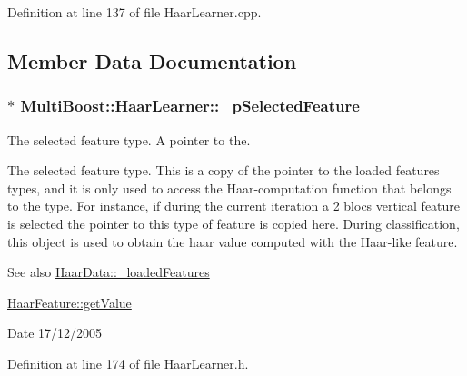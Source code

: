 Definition at line 137 of file HaarLearner.cpp.



\subsection{Member Data Documentation}
\hypertarget{classMultiBoost_1_1HaarLearner_a839d58f0936493fc3b1e06d531eaf4e0}{
\subsubsection[{\_\-pSelectedFeature}]{$\ast$ {\bf MultiBoost::HaarLearner::\_\-pSelectedFeature}}}
\label{classMultiBoost_1_1HaarLearner_a839d58f0936493fc3b1e06d531eaf4e0}


The selected feature type. A pointer to the. 

The selected feature type. This is a copy of the pointer to the loaded features types, and it is only used to access the Haar-\/computation function that belongs to the type. For instance, if during the current iteration a 2 blocs vertical feature is selected the pointer to this type of feature is copied here. During classification, this object is used to obtain the haar value computed with the Haar-\/like feature. \begin{DoxySeeAlso}{See also}
\hyperlink{classMultiBoost_1_1HaarData_a9afda9dde6bbde709c5e75246e52d56e}{HaarData::\_\-loadedFeatures} 

\hyperlink{classMultiBoost_1_1HaarFeature_a57d0ba94269beef5e8ed1ab984bc3099}{HaarFeature::getValue} 
\end{DoxySeeAlso}
\begin{DoxyDate}{Date}
17/12/2005 
\end{DoxyDate}


Definition at line 174 of file HaarLearner.h.

